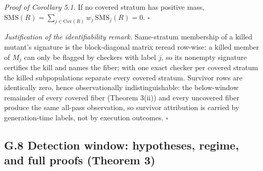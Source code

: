 \documentclass[manuscript,screen,review]{acmart}
\begin{document}
\emph{Proof of Corollary 5.1.} If no covered stratum has positive mass,
$\mathrm{SMS}(R)=\sum_{j\in\mathrm{Cov}(R)}w_j\,\mathrm{SMS}_j(R)=0$.
$\square$

\emph{Justification of the identifiability remark.} Same-stratum
membership of a killed mutant's signature is the block-diagonal matrix
reread row-wise: a killed member of $M_j$ can only be flagged by
checkers with label $j$, so its nonempty signature certifies the kill
and names the fiber; with one exact checker per covered stratum the
killed subpopulations separate every covered stratum. Survivor rows are
identically zero, hence observationally indistinguishable: the
below-window remainder of every covered fiber (Theorem 3(ii)) and every
uncovered fiber produce the same all-pass observation, so survivor
attribution is carried by generation-time labels, not by execution
outcomes. $\square$

\subsection{G.8 Detection window: hypotheses, regime, and full proofs (Theorem 3)}\label{g.8-window-proofs}
\end{document}
